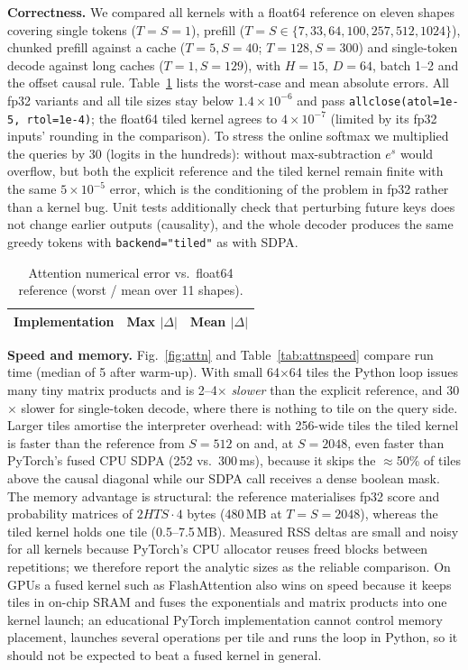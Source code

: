 \textbf{Correctness.} We compared all kernels with a float64 reference on eleven shapes covering single tokens ($T{=}S{=}1$), prefill ($T{=}S\in\{7,33,64,100,257,512,1024\}$), chunked prefill against a cache ($T{=}5,S{=}40$; $T{=}128,S{=}300$) and single-token decode against long caches ($T{=}1,S{=}129$), with $H{=}15$, $D{=}64$, batch 1--2 and the offset causal rule. Table~\ref{tab:attnerr} lists the worst-case and mean absolute errors. All fp32 variants and all tile sizes stay below $1.4\times10^{-6}$ and pass \texttt{allclose(atol=1e-5, rtol=1e-4)}; the float64 tiled kernel agrees to $4\times10^{-7}$ (limited by its fp32 inputs' rounding in the comparison). To stress the online softmax we multiplied the queries by 30 (logits in the hundreds): without max-subtraction $e^{s}$ would overflow, but both the explicit reference and the tiled kernel remain finite with the same $5\times10^{-5}$ error, which is the conditioning of the problem in fp32 rather than a kernel bug. Unit tests additionally check that perturbing future keys does not change earlier outputs (causality), and the whole decoder produces the same greedy tokens with \texttt{backend="tiled"} as with SDPA.

\begin{table}[t]\centering\caption{Attention numerical error vs.\ float64 reference (worst / mean over 11 shapes).}\label{tab:attnerr}
\begin{tabular}{lrr}\toprule
Implementation & Max $|\Delta|$ & Mean $|\Delta|$\\\midrule

\bottomrule\end{tabular}\end{table}

\textbf{Speed and memory.} Fig.~\ref{fig:attn} and Table~\ref{tab:attnspeed} compare run time (median of 5 after warm-up). With small 64$\times$64 tiles the Python loop issues many tiny matrix products and is 2--4$\times$ \emph{slower} than the explicit reference, and 30$\times$ slower for single-token decode, where there is nothing to tile on the query side. Larger tiles amortise the interpreter overhead: with 256-wide tiles the tiled kernel is faster than the reference from $S{=}512$ on and, at $S{=}2048$, even faster than PyTorch's fused CPU SDPA (252 vs.\ 300\,ms), because it skips the $\approx$50\% of tiles above the causal diagonal while our SDPA call receives a dense boolean mask. The memory advantage is structural: the reference materialises fp32 score and probability matrices of $2HTS\cdot4$ bytes (480\,MB at $T{=}S{=}2048$), whereas the tiled kernel holds one tile (0.5--7.5\,MB). Measured RSS deltas are small and noisy for all kernels because PyTorch's CPU allocator reuses freed blocks between repetitions; we therefore report the analytic sizes as the reliable comparison. On GPUs a fused kernel such as FlashAttention also wins on speed because it keeps tiles in on-chip SRAM and fuses the exponentials and matrix products into one kernel launch; an educational PyTorch implementation cannot control memory placement, launches several operations per tile and runs the loop in Python, so it should not be expected to beat a fused kernel in general.

